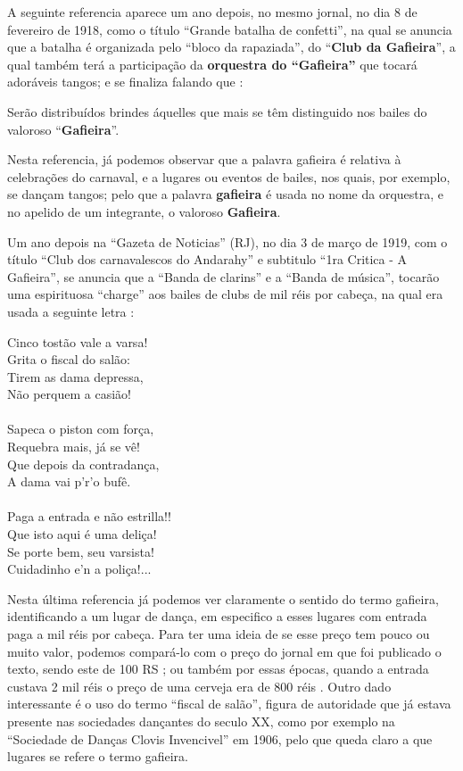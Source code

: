 A seguinte referencia aparece um ano depois, no mesmo jornal,
no dia 8 de fevereiro de 1918, como o título ``Grande batalha de confetti'',
na qual se anuncia que a batalha é organizada pelo ``bloco da rapaziada'',
do ``\textbf{Club da Gafieira}'', a qual também terá a participação 
da \textbf{orquestra do ``Gafieira''} que tocará adoráveis tangos;
e se finaliza falando que  \cite[pp. 7]{oldgafieira2} \cite[pp. 629]{spielmann2016reflexoes}:
\begin{citando}
Serão distribuídos brindes áquelles que mais se têm distinguido nos bailes do valoroso ``\textbf{Gafieira}''.
\end{citando}
Nesta referencia, já podemos observar que a palavra gafieira é relativa à celebrações do carnaval, 
e a lugares ou eventos de bailes,
nos quais, por exemplo, se dançam tangos; 
pelo que a palavra \textbf{gafieira} é usada no nome da orquestra,
e no apelido de um integrante, o valoroso \textbf{Gafieira}.

Um ano depois na ``Gazeta de Noticias'' (RJ),
no dia 3 de março de 1919, com o título ``Club dos carnavalescos do Andarahy'' e subtitulo ``1ra Critica - A Gafieira'',
se anuncia que a ``Banda de clarins'' e a ``Banda de música'',
tocarão uma espirituosa ``charge'' aos bailes de clubs de mil réis por cabeça, 
na qual era  usada a seguinte letra \cite[pp. 5]{oldgafieira3} \cite[pp. 629]{spielmann2016reflexoes}:
\begin{citando}
Cinco tostão vale a varsa!\\
Grita o fiscal do salão:\\
Tirem as dama depressa,\\
Não perquem a casião!\\ ~\\
Sapeca o piston com força,\\
Requebra mais, já se vê!\\
Que depois da contradança,\\
A dama vai p'r'o bufê.\\ ~\\
Paga a entrada e não estrilla!!\\
Que isto aqui é uma deliça!\\
Se porte bem, seu varsista!\\
Cuidadinho e'n a poliça!...
\end{citando}
Nesta última referencia já podemos ver claramente o sentido do termo gafieira,
identificando a um lugar de dança, em especifico a esses lugares com entrada paga a mil réis por cabeça.
Para ter uma ideia de se esse preço tem pouco ou muito valor, podemos compará-lo com o 
preço do jornal em que foi publicado o texto, sendo este de 100 RS \cite[pp. 1]{oldgafieira3};
ou também por essas épocas, 
quando a entrada custava 2 mil réis o preço de uma cerveja  era  de 800 réis \cite[pp. 1 - cad. B]{gafieira2000reis}.
Outro dado interessante é o uso do termo ``fiscal de salão'', 
figura de autoridade que já estava presente 
nas sociedades dançantes do seculo XX, como por exemplo na 
``Sociedade de Danças Clovis Invencivel'' em 1906, pelo que queda claro
a que lugares se refere o termo gafieira.


